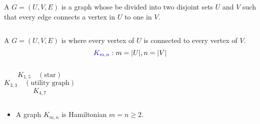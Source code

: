 \begin{frame}{}
  \begin{definition}
    A  $G = (U, V, E)$ is a graph
    whose   be divided into
    two disjoint sets $U$ and $V$ such that
    every edge connects a vertex in $U$ to one in $V$.
  \end{definition}

  \begin{columns}
      \pause
  \end{columns}
\end{frame}

\begin{frame}{}
  \begin{definition}
    A  $G = (U, V, E)$ is 
    where every vertex of $U$ is connected to every vertex of $V$.
    \[
      \textcolor{blue}{K_{m, n}}: m = |U|, n = |V|
    \]
  \end{definition}

  \pause
  \begin{columns}
      \[
        K_{1, 5} \quad (\text{star})
      \]
      \[
        K_{3, 3} \quad (\text{utility graph})
      \]
      \[
        K_{4, 7}
      \]
  \end{columns}
\end{frame}

\begin{frame}{}
  \begin{exampleblock}{}
    \begin{itemize}
      \item A  graph $K_{m, n}$ is Hamiltonian
         $m = n \ge 2$.
    \end{itemize}
  \end{exampleblock}

  \pause
  \vspace{0.60cm}
  \begin{columns}
  \end{columns}
\end{frame}

